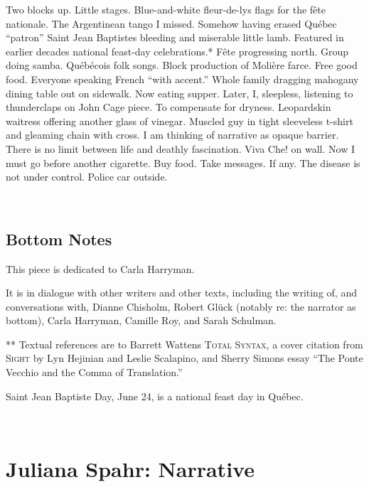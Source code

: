 \documentclass[
]{memoir}
\begin{document}
Two blocks up. Little stages. Blue-and-white fleur-de-lys flags for the
fête nationale. The Argentinean tango I missed. Somehow having erased
Québec ``patron'' Saint Jean Baptistes bleeding and miserable little
lamb. Featured in earlier decades national feast-day celebrations.* Fête
progressing north. Group doing samba. Québécois folk songs. Block
production of Molière farce. Free good food. Everyone speaking French
``with accent.'' Whole family dragging mahogany dining table out on
sidewalk. Now eating supper. Later, I, sleepless, listening to
thunderclaps on John Cage piece. To compensate for dryness. Leopardskin
waitress offering another glass of vinegar. Muscled guy in tight
sleeveless t-shirt and gleaming chain with cross. I am thinking of
narrative as opaque barrier. There is no limit between life and deathly
fascination. Viva Che! on wall. Now I must go before another cigarette.
Buy food. Take messages. If any. The disease is not under control.
Police car outside.

~

\hypertarget{bottom-notes}{%
\section*{Bottom Notes}\label{bottom-notes}}

This piece is dedicated to Carla Harryman.

It is in dialogue with other writers and other texts, including the
writing of, and conversations with, Dianne Chisholm, Robert Glück
(notably re: the narrator as bottom), Carla Harryman, Camille Roy, and
Sarah Schulman.

** Textual references are to Barrett Wattens \textsc{Total Syntax}, a
cover citation from \textsc{Sight} by Lyn Hejinian and Leslie Scalapino,
and Sherry Simons essay ``The Ponte Vecchio and the Comma of
Translation.''

Saint Jean Baptiste Day, June 24, is a national feast day in Québec.

~

\hypertarget{juliana-spahr-narrative}{%
\chapter{Juliana Spahr: Narrative}\label{juliana-spahr-narrative}}
\end{document}
